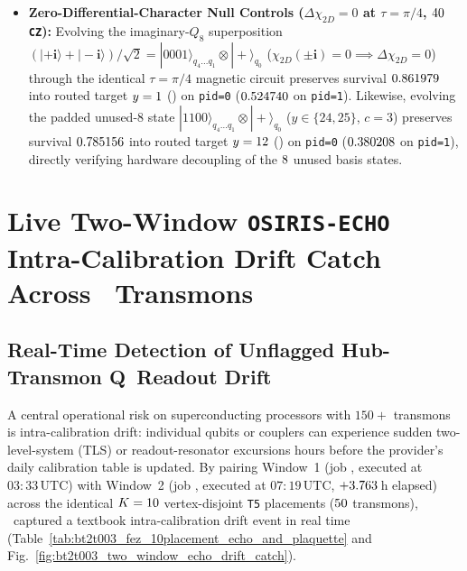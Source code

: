 \documentclass[aps,prx,twocolumn,superscriptaddress,nofootinbib]{revtex4-2}
\begin{document}
\begin{itemize}
\item \textbf{Zero-Differential-Character Null Controls ($\Delta\chi_{2D} = 0$ at $\tau = \pi/4$, $40$ \texttt{CZ}):} Evolving the imaginary-$Q_8$ superposition $(|+\mathbf{i}\rangle + |-\mathbf{i}\rangle)/\sqrt{2} = |0001\rangle_{q_4\dots q_1}\otimes|+\rangle_{q_0}$ ($\chi_{2D}(\pm\mathbf{i}) = 0 \implies \Delta\chi_{2D} = 0$) through the identical $\tau = \pi/4$ magnetic circuit preserves survival $0.861979$ into routed target $y = 1$ (\BTPlaqRoutedBitsImagNull) on \texttt{pid=0} ($0.524740$ on \texttt{pid=1}). Likewise, evolving the padded unused-$8$ state $|1100\rangle_{q_4\dots q_1}\otimes|+\rangle_{q_0}$ ($y \in \{24,25\}$, $c = 3$) preserves survival $0.785156$ into routed target $y = 12$ (\BTPlaqRoutedBitsUnusedNull) on \texttt{pid=0} ($0.380208$ on \texttt{pid=1}), directly verifying hardware decoupling of the $8$ unused basis states.
\end{itemize}



\section{Live Two-Window \texttt{OSIRIS-ECHO} Intra-Calibration Drift Catch Across \BTPlaqFezTotalTransmons\ Transmons}

\subsection{Real-Time Detection of Unflagged Hub-Transmon Q\BTPlaqDriftedHubQubit\ Readout Drift}

A central operational risk on superconducting processors with $150+$ transmons is intra-calibration drift: individual qubits or couplers can experience sudden two-level-system (TLS) or readout-resonator excursions hours before the provider's daily calibration table is updated. By pairing Window~1 (job \BTPlaqFezWindowOneJobId, executed at $03{:}33\,\mathrm{UTC}$) with Window~2 (job \BTPlaqFezJobId, executed at $07{:}19\,\mathrm{UTC}$, $+3.763$\,h elapsed) across the identical $K = 10$ vertex-disjoint \texttt{T5} placements ($50$ transmons), \BTPlaqFezProtocolId\ captured a textbook intra-calibration drift event in real time (Table~\ref{tab:bt2t003_fez_10placement_echo_and_plaquette} and Fig.~\ref{fig:bt2t003_two_window_echo_drift_catch}).
\end{document}
